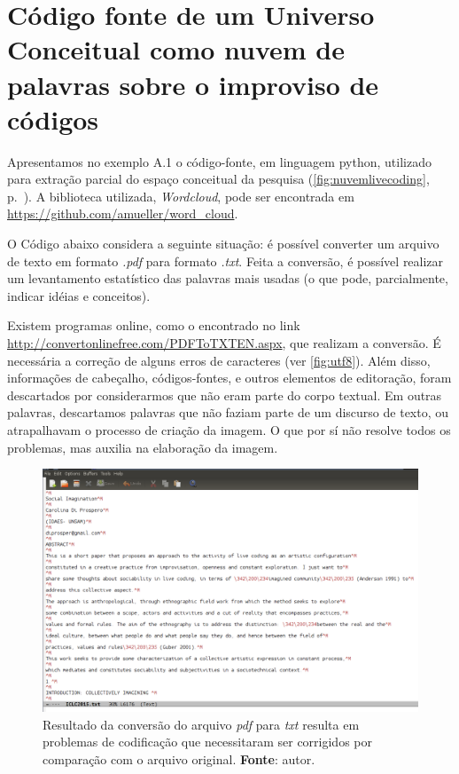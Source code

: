 \chapter{Código fonte de um Universo Conceitual como nuvem de palavras sobre o improviso de códigos}\label{app:A}

Apresentamos no exemplo A.1 o código-fonte, em linguagem python, utilizado para extração parcial do espaço conceitual da pesquisa (\autoref{fig:nuvemlivecoding}, p.~\pageref{fig:nuvemlivecoding}). A biblioteca utilizada, \emph{Wordcloud}, pode ser encontrada em \url{https://github.com/amueller/word_cloud}.

O Código abaixo considera a seguinte situação: é possível converter um arquivo de texto em formato \emph{.pdf} para formato \emph{.txt}. Feita a conversão, é possível realizar um levantamento estatístico das palavras mais usadas (o que pode, parcialmente, indicar idéias e conceitos).

 Existem programas online, como o encontrado no link \url{http://convertonlinefree.com/PDFToTXTEN.aspx}, que realizam a conversão. É necessária a correção de alguns erros de caracteres (ver \autoref{fig:utf8}). Além disso, informações de cabeçalho, códigos-fontes, e outros elementos de editoração, foram descartados por considerarmos que não eram parte do corpo textual. Em outras palavras, descartamos palavras que não faziam parte de um discurso de texto, ou atrapalhavam o processo de criação da imagem. O que por sí não resolve todos os problemas, mas auxilia na elaboração da imagem.

\begin{figure}[!h]
  \centering
  \includegraphics[scale=0.3]{imagens/utf8.png}
  \caption{Resultado da conversão do arquivo \emph{pdf} para \emph{txt} resulta em problemas de codificação que necessitaram ser corrigidos por comparação com o arquivo original. \textbf{Fonte}: autor.}
  \label{fig:utf8}
\end{figure}


